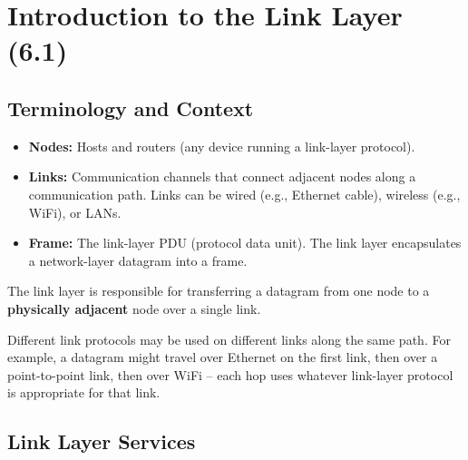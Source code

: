\section{Introduction to the Link Layer (6.1)}

\subsection{Terminology and Context}

\begin{keybox}
\begin{itemize}[noitemsep]
    \item \textbf{Nodes:} Hosts and routers (any device running a link-layer protocol).
    \item \textbf{Links:} Communication channels that connect adjacent nodes along a communication path. Links can be wired (e.g., Ethernet cable), wireless (e.g., WiFi), or LANs.
    \item \textbf{Frame:} The link-layer PDU (protocol data unit). The link layer encapsulates a network-layer datagram into a frame.
\end{itemize}

\medskip
The link layer is responsible for transferring a datagram from one node to a \textbf{physically adjacent} node over a single link.
\end{keybox}

\begin{warnbox}
Different link protocols may be used on different links along the same path. For example, a datagram might travel over Ethernet on the first link, then over a point-to-point link, then over WiFi -- each hop uses whatever link-layer protocol is appropriate for that link.
\end{warnbox}

\subsection{Link Layer Services}

